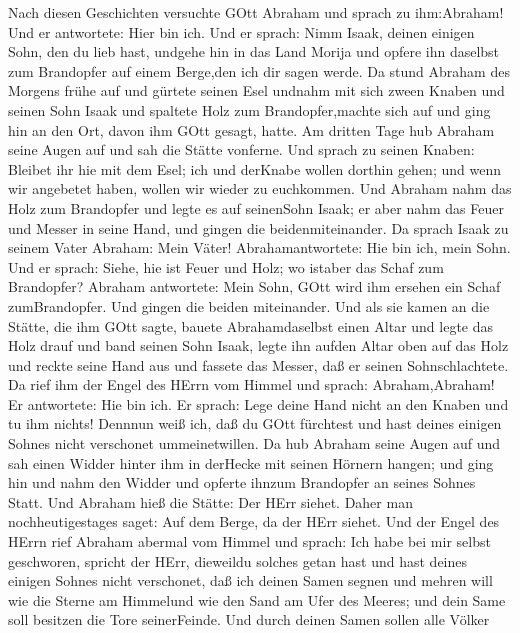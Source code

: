  Nach diesen Geschichten versuchte GOtt Abraham und sprach
zu ihm:Abraham! Und er antwortete: Hier bin ich.  Und er
sprach: Nimm Isaak, deinen einigen Sohn, den du lieb hast, undgehe hin
in das Land Morija und opfere ihn daselbst zum Brandopfer auf einem
Berge,den ich dir sagen werde.  Da stund Abraham des Morgens
frühe auf und gürtete seinen Esel undnahm mit sich zween Knaben und
seinen Sohn Isaak und spaltete Holz zum Brandopfer,machte sich auf und
ging hin an den Ort, davon ihm GOtt gesagt, hatte.  Am
dritten Tage hub Abraham seine Augen auf und sah die Stätte vonferne.
 Und sprach zu seinen Knaben: Bleibet ihr hie mit dem Esel;
ich und derKnabe wollen dorthin gehen; und wenn wir angebetet haben,
wollen wir wieder zu euchkommen.  Und Abraham nahm das Holz
zum Brandopfer und legte es auf seinenSohn Isaak; er aber nahm das Feuer
und Messer in seine Hand, und gingen die beidenmiteinander. 
Da sprach Isaak zu seinem Vater Abraham: Mein Väter! Abrahamantwortete:
Hie bin ich, mein Sohn. Und er sprach: Siehe, hie ist Feuer und Holz; wo
istaber das Schaf zum Brandopfer?  Abraham antwortete: Mein
Sohn, GOtt wird ihm ersehen ein Schaf zumBrandopfer. Und gingen die
beiden miteinander.  Und als sie kamen an die Stätte, die
ihm GOtt sagte, bauete Abrahamdaselbst einen Altar und legte das Holz
drauf und band seinen Sohn Isaak, legte ihn aufden Altar oben auf das
Holz  und reckte seine Hand aus und fassete das Messer, daß
er seinen Sohnschlachtete.  Da rief ihm der Engel des HErrn
vom Himmel und sprach: Abraham,Abraham! Er antwortete: Hie bin ich.
 Er sprach: Lege deine Hand nicht an den Knaben und tu ihm
nichts! Dennnun weiß ich, daß du GOtt fürchtest und hast deines einigen
Sohnes nicht verschonet ummeinetwillen.  Da hub Abraham
seine Augen auf und sah einen Widder hinter ihm in derHecke mit seinen
Hörnern hangen; und ging hin und nahm den Widder und opferte ihnzum
Brandopfer an seines Sohnes Statt.  Und Abraham hieß die
Stätte: Der HErr siehet. Daher man nochheutigestages saget: Auf dem
Berge, da der HErr siehet.  Und der Engel des HErrn rief
Abraham abermal vom Himmel  und sprach: Ich habe bei mir
selbst geschworen, spricht der HErr, dieweildu solches getan hast und
hast deines einigen Sohnes nicht verschonet,  daß ich
deinen Samen segnen und mehren will wie die Sterne am Himmelund wie den
Sand am Ufer des Meeres; und dein Same soll besitzen die Tore
seinerFeinde.  Und durch deinen Samen sollen alle Völker
